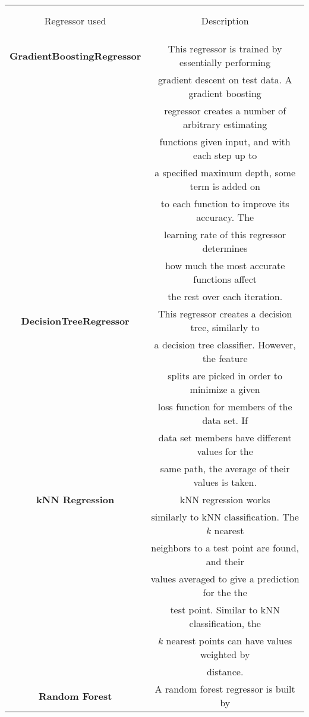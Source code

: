 \documentclass[11pt]{article}
\begin{document}
\begin{table}[H]
\centering
\begin{tabular}{|c|c|}
\hline
\\ & \\ Regressor used  & Description \\ & \\ \hline
\\ & \\ \textbf{GradientBoostingRegressor} & This regressor is trained by essentially performing \\
& gradient descent on test data. A gradient boosting \\
& regressor creates a number of arbitrary estimating \\
& functions given input, and with each step up to\\
& a specified maximum depth, some term is added on\\
& to each function to improve its accuracy. The \\
& learning rate of this regressor determines\\
& how much the most accurate functions affect \\
& the rest over each iteration.\\ \hline
\textbf{DecisionTreeRegressor} & This regressor creates a decision tree, similarly to \\
& a decision tree classifier. However, the feature\\
& splits are picked in order to minimize a given \\
& loss function for members of the data set. If \\
& data set members have different values for the\\
& same path, the average of their values is taken.\\ \hline
\textbf{kNN Regression} & kNN regression works \\
&similarly to kNN classification. The $k$ nearest \\
& neighbors to a test point are found, and their \\
& values averaged to give a prediction for the the \\
& test point. Similar to kNN classification, the \\
& $k$ nearest points can have values weighted by \\
& distance. \\ \hline
\textbf{Random Forest } & A random forest regressor is built by \\

\end{tabular}
\end{table}
\end{document}

